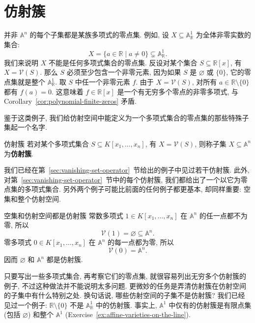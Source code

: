 \section{仿射簇}\label{sec:affine-varieties}

并非 $\mathbb{A}^{n}$ 的每个子集都是某族多项式的零点集. 例如, 设 $X\subseteq\mathbb{A}^{1}_{\mathbb{R}}$ 为全体非零实数的集合:
\[
  X=\{a\in\mathbb{R}\mid a\ne0\}\subsetneq\mathbb{A}^{1}_{\mathbb{R}}.
\]
我们来说明 $X$ 不能是任何多项式集合的零点集. 反设对某个集合 $S\subseteq\mathbb{R}[x]$, 有 $X=\mathcal{V}(S)$. 那么 $S$ 必须至少包含一个非零元素, 因为如果 $S$ 是 $\varnothing$ 或 $\{0\}$, 它的零点集就是整个 $\mathbb{A}^{1}_{\mathbb{R}}$. 取 $S$ 中任一个非零元素 $f$. 由于 $X=\mathcal{V}(S)$, 对所有 $a\in\mathbb{R}\setminus\{0\}$ 都有 $f(a)=0$. 这意味着 $f\in\mathbb{R}[x]$ 是一个有无穷多个零点的非零多项式, 与 Corollary~\ref{cor:polynomial-finite-zeros} 矛盾.

鉴于这类例子, 我们给仿射空间中能定义为一个多项式集合的零点集的那些特殊子集起一个名字.

\begin{Definition}{仿射簇}\leavevmode\label{def:affine-variety}
  若对某个多项式集合 $S\subseteq K[x_{1},\ldots,x_{n}]$, 有 $X=\mathcal{V}(S)$, 则称子集 $X\subseteq\mathbb{A}^{n}$ 为\textbf{仿射簇}.
\end{Definition}

我们已经在第~\ref{sec:vanishing-set-operator}~节给出的例子中见过若干仿射簇. 此外, 对第~\ref{sec:vanishing-set-operator}~节中的每个仿射簇, 我们都给出了一个以它为零点集的多项式集合. 另外两个例子可能比前面的任何例子都更基本, 却同样重要: 空集和整个仿射空间.

\begin{Example}{空集和仿射空间都是仿射簇}\leavevmode\label{ex:empty-and-full-affine-varieties}
  常数多项式 $1\in K[x_{1},\ldots,x_{n}]$ 在 $\mathbb{A}^{n}$ 的任一点都不为零, 所以
  \[
    \mathcal{V}(1)=\varnothing\subseteq\mathbb{A}^{n}.
  \]
  零多项式 $0\in K[x_{1},\ldots,x_{n}]$ 在 $\mathbb{A}^{n}$ 的每一点都为零, 所以
  \[
    \mathcal{V}(0)=\mathbb{A}^{n}.
  \]
  因而 $\varnothing$ 和 $\mathbb{A}^{n}$ 都是仿射簇.
\end{Example}

只要写出一些多项式集合, 再考察它们的零点集, 就很容易列出无穷多个仿射簇的例子, 不过这种做法并不能说明太多问题. 更微妙的任务是弄清仿射簇在仿射空间的子集中有什么特别之处. 换句话说, 哪些仿射空间的子集不是仿射簇? 我们已经见过一个例子: $\mathbb{R}\setminus\{0\}$ 不是 $\mathbb{A}^{1}_{\mathbb{R}}$ 中的仿射簇. 事实上, $\mathbb{A}^{1}$ 中仅有的仿射簇是有限点集 (包括 $\varnothing$) 和整个 $\mathbb{A}^{1}$ (Exercise~\ref{ex:affine-varieties-on-the-line}).

